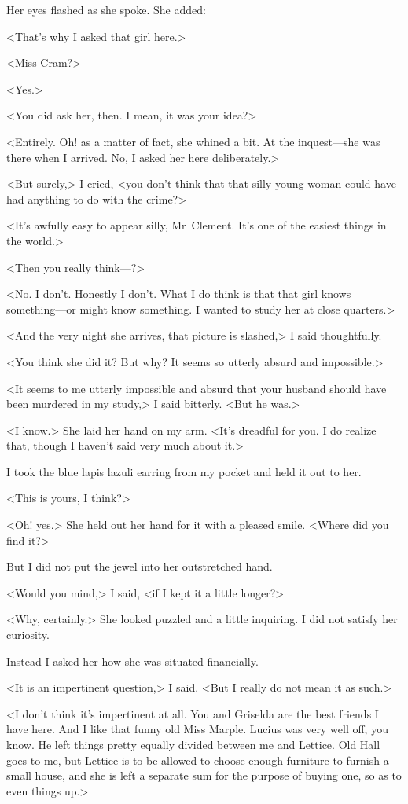 Her eyes flashed as she spoke. She added:

<That's why I asked that girl here.>

<Miss Cram?>

<Yes.>

<You did ask her, then. I mean, it was your idea?>

<Entirely. Oh! as a matter of fact, she whined a bit. At the inquest—she was there when I arrived. No, I asked her here deliberately.>

<But surely,> I cried, <you don't think that that silly young woman could have had anything to do with the crime?>

<It's awfully easy to appear silly, Mr~Clement. It's one of the easiest things in the world.>

<Then you really think—?>

<No. I don't. Honestly I don't. What I do think is that that girl knows something—or might know something. I wanted to study her at close quarters.>

<And the very night she arrives, that picture is slashed,> I said thoughtfully.

<You think she did it? But why? It seems so utterly absurd and impossible.>

<It seems to me utterly impossible and absurd that your husband should have been murdered in my study,> I said bitterly. <But he was.>

<I know.> She laid her hand on my arm. <It's dreadful for you. I do realize that, though I haven't said very much about it.>

I took the blue lapis lazuli earring from my pocket and held it out to her.

<This is yours, I think?>

<Oh! yes.> She held out her hand for it with a pleased smile. <Where did you find it?>

But I did not put the jewel into her outstretched hand.

<Would you mind,> I said, <if I kept it a little longer?>

<Why, certainly.> She looked puzzled and a little inquiring. I did not satisfy her curiosity.

Instead I asked her how she was situated financially.

<It is an impertinent question,> I said. <But I really do not mean it as such.>

<I don't think it's impertinent at all. You and Griselda are the best friends I have here. And I like that funny old Miss Marple. Lucius was very well off, you know. He left things pretty equally divided between me and Lettice. Old Hall goes to me, but Lettice is to be allowed to choose enough furniture to furnish a small house, and she is left a separate sum for the purpose of buying one, so as to even things up.>

